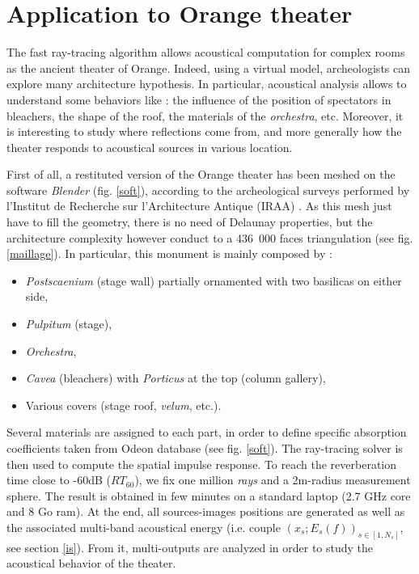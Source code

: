 \documentclass[AMA,STIX1COL]{WileyNJD-v2}
\begin{document}
\section{Application to Orange theater}

The fast ray-tracing algorithm allows acoustical computation for complex rooms as the ancient theater of Orange. Indeed, using a virtual model, archeologists can explore many architecture hypothesis. In particular, acoustical analysis allows to understand some behaviors like : the influence of the position of spectators in bleachers, the shape of the roof, the materials of the \textit{orchestra}, etc. Moreover, it is interesting to study where reflections come from, and more generally how the theater responds to acoustical sources in various location.     

First of all, a restituted version of the Orange theater has been meshed on the software \textit{Blender} (fig. \ref{soft}), according to the archeological surveys performed by l'Institut de Recherche sur l'Architecture Antique (IRAA) \cite{orangeTxt}. As this mesh just have to fill the geometry, there is no need of Delaunay properties, but the architecture complexity however conduct to a 436~000 faces triangulation (see fig. \ref{maillage}). In particular, this monument is mainly composed by :
\begin{itemize}
 \item \textit{Postscaenium} (stage wall) partially ornamented with two basilicas on either side,
 \item \textit{Pulpitum} (stage),
 \item \textit{Orchestra},
 \item \textit{Cavea} (bleachers) with \textit{Porticus} at the top (column gallery),
  \item Various covers (stage roof, \textit{velum}, etc.).
\end{itemize}
Several materials are assigned to each part, in order to define specific absorption coefficients taken from Odeon database \cite{odeon} (see fig. \ref{soft}). The ray-tracing solver is then used to compute the spatial impulse response. To reach the reverberation time close to -60dB ($RT_{60}$), we fix one million \textit{rays} and a 2m-radius measurement sphere. The result is obtained in few minutes on a standard laptop (2.7 GHz core and 8 Go ram). At the end, all sources-images positions are generated as well as the associated multi-band acoustical energy (i.e. couple $(x_s;E_s(f))_{s \in [1, N_s]}$, see section \ref{is}). From it, multi-outputs are analyzed in order to study the acoustical behavior of the theater.
\end{document}
